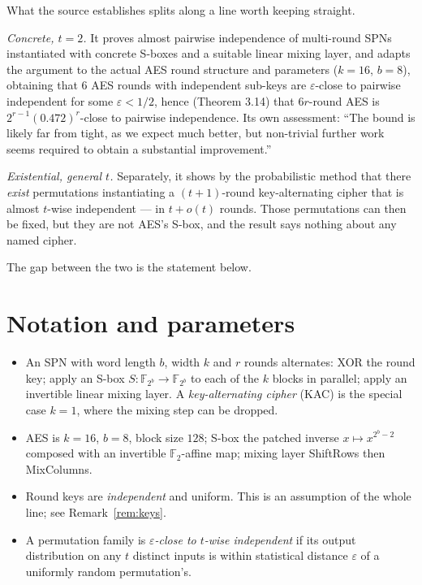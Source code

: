 \documentclass{conjura-conjecture}
\newcommand{\eps}{\varepsilon}
\begin{document}
What the source establishes splits along a line worth keeping straight.

\emph{Concrete, $t = 2$.} It proves almost pairwise independence of
multi-round SPNs instantiated with concrete S-boxes and a suitable linear
mixing layer, and adapts the argument to the actual AES round structure
and parameters ($k = 16$, $b = 8$), obtaining that $6$ AES rounds with
independent sub-keys are $\eps$-close to pairwise independent for some
$\eps < 1/2$, hence (Theorem 3.14) that $6r$-round AES is
$2^{r-1}(0.472)^{r}$-close to pairwise independence. Its own assessment:
``The bound is likely far from tight, as we expect much better, but
non-trivial further work seems required to obtain a substantial
improvement.''

\emph{Existential, general $t$.} Separately, it shows by the probabilistic
method that there \emph{exist} permutations instantiating a
$(t+1)$-round key-alternating cipher that is almost $t$-wise independent
--- in $t + o(t)$ rounds. Those permutations can then be fixed, but they
are not AES's S-box, and the result says nothing about any named cipher.

The gap between the two is the statement below.

\section{Notation and parameters}\label{sec:notation}

\begin{itemize}[nosep]
  \item An SPN with word length $b$, width $k$ and $r$ rounds alternates:
    XOR the round key; apply an S-box $S : \mathbb{F}_{2^{b}} \to
    \mathbb{F}_{2^{b}}$ to each of the $k$ blocks in parallel; apply an
    invertible linear mixing layer. A \emph{key-alternating cipher} (KAC)
    is the special case $k = 1$, where the mixing step can be dropped.
  \item AES is $k = 16$, $b = 8$, block size $128$; S-box the patched
    inverse $x \mapsto x^{2^{b}-2}$ composed with an invertible
    $\mathbb{F}_{2}$-affine map; mixing layer ShiftRows then MixColumns.
  \item Round keys are \emph{independent} and uniform. This is an
    assumption of the whole line; see Remark~\ref{rem:keys}.
  \item A permutation family is \emph{$\eps$-close to $t$-wise
    independent} if its output distribution on any $t$ distinct inputs is
    within statistical distance $\eps$ of a uniformly random
    permutation's.
\end{itemize}
\end{document}
